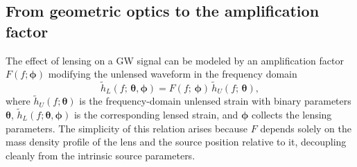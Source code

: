 \subsection{From geometric optics to the amplification factor}

The effect of lensing on a GW signal can be modeled by an 
amplification factor $F(f;\boldsymbol{\phi})$ 
modifying the unlensed waveform in the frequency domain 
\cite{pointmasslens}
\begin{equation}
    \tilde{h}_L(f;\,\boldsymbol{\theta},\boldsymbol{\phi}) = 
    F(f;\,\boldsymbol{\phi})\,
    \tilde{h}_U(f;\,\boldsymbol{\theta}),
    \label{eq:amplification_factor}
\end{equation}
where $\tilde{h}_U(f;\boldsymbol{\theta})$ is the 
frequency-domain unlensed strain with binary parameters 
$\boldsymbol{\theta}$, $\tilde{h}_L(f;\boldsymbol{\theta},
\boldsymbol{\phi})$ is the corresponding lensed strain, 
and $\boldsymbol{\phi}$ collects the lensing parameters. 
The simplicity of this relation arises because $F$ depends 
solely on the mass density profile of the lens and the 
source position relative to it, decoupling cleanly from 
the intrinsic source parameters.

